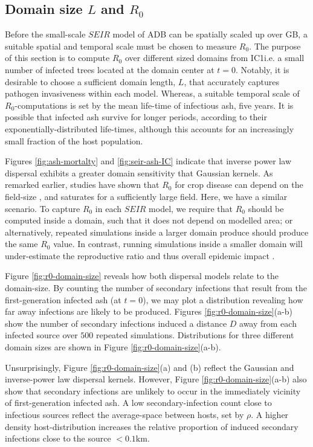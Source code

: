 \subsection{Domain size $L$ and $R_0$}

Before the small-scale $SEIR$ model of ADB can be spatially scaled up over GB, a suitable spatial and temporal scale must be chosen to measure $R_0$.
The purpose of this section is to compute $R_0$ over different sized domains from IC1\textemdash i.e. a small number of infected trees located at the domain center at $t=0$.
Notably, it is desirable to choose a sufficient domain length, $L$, that accurately captures pathogen invasiveness within each model.
Whereas, a suitable temporal scale of $R_0$-computations is set by the mean life-time of infectious ash, five years.
It is possible that infected ash survive for longer periods, according to their exponentially-distributed life-times, although this accounts for an increasingly small fraction of the host population.

Figures \ref{fig:ash-mortalty} and \ref{fig:seir-ash-IC} indicate that inverse power law dispersal exhibits a greater domain sensitivity that Gaussian kernels.
As remarked earlier, studies have shown that $R_0$ for crop disease can depend on the field-size \cite{mikaberidze2016invasiveness}, and saturates for a sufficiently large field.
Here, we have a similar scenario.
To capture $R_0$ in each $SEIR$ model, we require that $R_0$ should be computed inside a domain, such that it does not depend on modelled area;
or alternatively, repeated simulations inside a larger domain produce should produce the same $R_0$ value.
In contrast, running simulations inside a smaller domain will under-estimate the reproductive ratio and thus overall epidemic impact \cite{R0-perc-ref, time-varying-infectivity}.

Figure \ref{fig:r0-domain-size} reveals how both dispersal models relate to the domain-size.
By counting the number of secondary infections that result from the first-generation infected ash (at $t=0$), we may plot a distribution revealing how far away infections are likely to be produced.
Figures \ref{fig:r0-domain-size}(a-b) show the number of secondary infections induced a distance $D$ away from each infected source over $500$ repeated simulations.
Distributions for three different domain sizes are shown in Figure \ref{fig:r0-domain-size}(a-b).

Unsurprisingly, Figure \ref{fig:r0-domain-size}(a) and (b) reflect the Gaussian and inverse-power law dispersal kernels. 
However, Figure \ref{fig:r0-domain-size}(a-b) also show that secondary infections are unlikely to occur in the immediately vicinity of first-generation infected ash.
A low secondary-infection count close to infectious sources reflect the average-space between hosts, set by $\rho$.
A higher density host-distribution increases the relative proportion of induced secondary infections close to the source $<0.1\mathrm{km}$.

